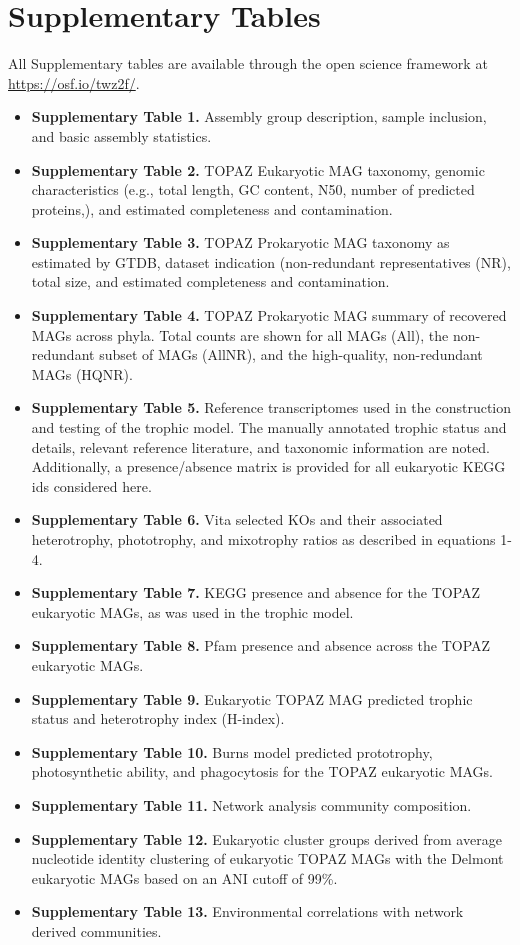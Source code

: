 \documentclass[12pt]{article}
\numberwithin{equation}{section}
\begin{document}
\section*{Supplementary Tables}

All Supplementary tables are available through the open science framework at \url{https://osf.io/twz2f/}. 

\begin{itemize}
    \item \textbf{Supplementary Table 1.} Assembly group description, sample inclusion, and basic assembly statistics. 
    \item \textbf{Supplementary Table 2.} TOPAZ Eukaryotic MAG taxonomy, genomic characteristics (e.g., total length, GC content, N50, number of predicted proteins,), and estimated completeness and contamination. 
    \item \textbf{Supplementary Table 3.} TOPAZ Prokaryotic MAG taxonomy as estimated by GTDB, dataset indication (non-redundant representatives (NR), total size, and estimated completeness and contamination. 
    \item \textbf{Supplementary Table 4.} TOPAZ Prokaryotic MAG summary of recovered MAGs across phyla. Total counts are shown for all MAGs (All), the non-redundant subset of MAGs (AllNR), and the high-quality, non-redundant MAGs (HQNR). 
    \item \textbf{Supplementary Table 5.} Reference transcriptomes used in the construction and testing of the trophic model. The manually annotated trophic status and details, relevant reference literature, and taxonomic information are noted. Additionally, a presence/absence matrix is provided for all eukaryotic KEGG ids considered here. 
    \item \textbf{Supplementary Table 6.} Vita selected KOs and their associated heterotrophy, phototrophy, and mixotrophy ratios as described in equations 1-4. 
    \item \textbf{Supplementary Table 7.}  KEGG presence and absence for the TOPAZ eukaryotic MAGs, as was used in the trophic model. 
    \item \textbf{Supplementary Table 8.} Pfam presence and absence across the TOPAZ eukaryotic MAGs. 
    \item \textbf{Supplementary Table 9.} Eukaryotic TOPAZ MAG predicted trophic status and heterotrophy index (H-index). 
    \item \textbf{Supplementary Table 10.} Burns model \citep{burns2018gene} predicted prototrophy, photosynthetic ability, and phagocytosis for the TOPAZ eukaryotic MAGs. 
    \item \textbf{Supplementary Table 11.} Network analysis community composition. 
    \item \textbf{Supplementary Table 12.} Eukaryotic cluster groups derived from average nucleotide identity clustering of eukaryotic TOPAZ MAGs with the Delmont eukaryotic MAGs \citep{Delmont_2020} based on an ANI cutoff of 99\%. 
    \item \textbf{Supplementary Table 13.} Environmental correlations with network derived communities. 
\end{itemize}
\end{document}
